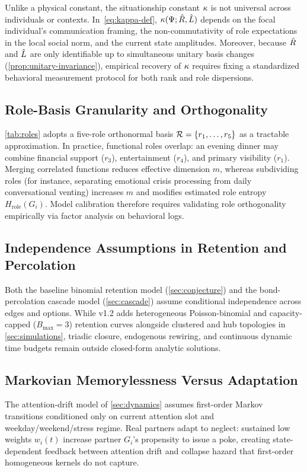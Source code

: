 Unlike a physical constant, the situationship constant $\kappa$ is not
universal across individuals or contexts. In~\eqref{eq:kappa-def},
$\kappa(\Psi; \hat{R}, \hat{L})$ depends on the focal individual's communication
framing, the non-commutativity of role expectations in the local social norm,
and the current state amplitudes. Moreover, because $\hat{R}$ and $\hat{L}$ are only
identifiable up to simultaneous unitary basis changes (\cref{prop:unitary-invariance}),
empirical recovery of $\kappa$ requires fixing a standardized behavioral
measurement protocol for both rank and role dispersions.

\subsection{Role-Basis Granularity and Orthogonality}
\label{subsec:lim-basis}

\cref{tab:roles} adopts a five-role orthonormal basis $\mathcal{R} = \{r_1, \dots, r_5\}$
as a tractable approximation. In practice, functional roles overlap: an evening
dinner may combine financial support ($r_3$), entertainment ($r_4$), and primary
visibility ($r_1$). Merging correlated functions reduces effective dimension
$m$, whereas subdividing roles (for instance, separating emotional crisis
processing from daily conversational venting) increases $m$ and modifies
estimated role entropy $H_{\mathrm{role}}(G_i)$. Model calibration therefore
requires validating role orthogonality empirically via factor analysis on
behavioral logs.

\subsection{Independence Assumptions in Retention and Percolation}
\label{subsec:lim-independence}

Both the baseline binomial retention model (\cref{sec:conjecture}) and the
bond-percolation cascade model (\cref{sec:cascade}) assume conditional independence
across edges and options. While v1.2 adds heterogeneous Poisson-binomial and
capacity-capped ($B_{\max} = 3$) retention curves alongside clustered and hub topologies
in \cref{sec:simulations}, triadic closure, endogenous rewiring, and continuous dynamic
time budgets remain outside closed-form analytic solutions.

\subsection{Markovian Memorylessness Versus Adaptation}
\label{subsec:lim-markov}

The attention-drift model of \cref{sec:dynamics} assumes first-order Markov
transitions conditioned only on current attention slot and weekday/weekend/stress
regime. Real partners adapt to neglect: sustained low weights $w_i(t)$ increase
partner $G_i$'s propensity to issue a poke, creating state-dependent feedback
between attention drift and collapse hazard that first-order homogeneous
kernels do not capture.
